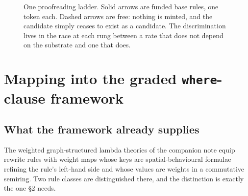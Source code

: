 \documentclass[11pt]{article}
\theoremstyle{plain}
\theoremstyle{definition}
\theoremstyle{remark}
\begin{document}
\begin{figure}[t]
\centering
{}
\caption{One proofreading ladder. Solid arrows are funded base rules, one
token each. Dashed arrows are free: nothing is minted, and the candidate
simply ceases to exist as a candidate. The discrimination lives in the race at
each rung between a rate that does not depend on the substrate and one that
does.}
\label{fig:ladder}
\end{figure}

\section{Mapping into the graded \texttt{where}-clause framework}
\label{sec:mapping}

\subsection{What the framework already supplies}

The weighted graph-structured lambda theories of the companion note equip
rewrite rules with weight maps whose keys are spatial-behavioural formulae
refining the rule's left-hand side and whose values are weights in a
commutative semiring. Two rule classes are distinguished there, and the
distinction is exactly the one \S2 needs.
\end{document}
